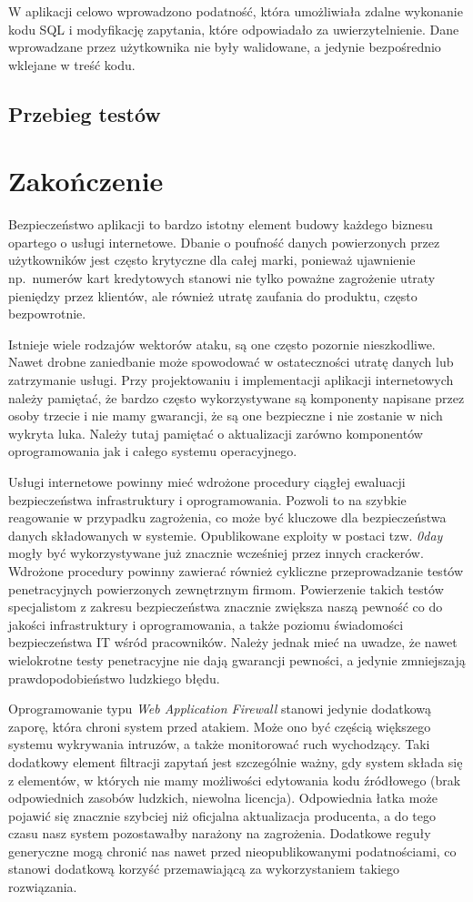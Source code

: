 \documentclass[11pt,a4paper,polish,thesis,oneside]{dcsbook}
\begin{document}
W aplikacji celowo wprowadzono podatność, która umożliwiała zdalne wykonanie kodu SQL i modyfikację zapytania, które odpowiadało za uwierzytelnienie. Dane wprowadzane przez użytkownika nie były walidowane, a jedynie bezpośrednio wklejane w treść kodu.


\section{Przebieg testów}


\chapter{Zakończenie}
Bezpieczeństwo aplikacji to bardzo istotny element budowy każdego biznesu opartego o usługi internetowe. Dbanie o poufność danych powierzonych przez użytkowników jest często krytyczne dla całej marki, ponieważ ujawnienie np.~numerów kart kredytowych stanowi nie tylko poważne zagrożenie utraty pieniędzy przez klientów, ale również utratę zaufania do produktu, często bezpowrotnie.

Istnieje wiele rodzajów wektorów ataku, są one często pozornie nieszkodliwe. Nawet drobne zaniedbanie może spowodować w ostateczności utratę danych lub zatrzymanie usługi. Przy projektowaniu i implementacji aplikacji internetowych należy pamiętać, że bardzo często wykorzystywane są komponenty napisane przez osoby trzecie i nie mamy gwarancji, że są one bezpieczne i nie zostanie w nich wykryta luka. Należy tutaj pamiętać o aktualizacji zarówno komponentów oprogramowania jak i całego systemu operacyjnego.

Usługi internetowe powinny mieć wdrożone procedury ciągłej ewaluacji bezpieczeństwa infrastruktury i oprogramowania. Pozwoli to na szybkie reagowanie w przypadku zagrożenia, co może być kluczowe dla bezpieczeństwa danych składowanych w systemie. Opublikowane exploity w postaci tzw. \textit{0day} mogły być wykorzystywane już znacznie wcześniej przez innych crackerów. Wdrożone procedury powinny zawierać również cykliczne przeprowadzanie testów penetracyjnych powierzonych zewnętrznym firmom. Powierzenie takich testów specjalistom z zakresu bezpieczeństwa znacznie zwiększa naszą pewność co do jakości infrastruktury i oprogramowania, a także poziomu świadomości bezpieczeństwa IT wśród pracowników. Należy jednak mieć na uwadze, że nawet wielokrotne testy penetracyjne nie dają gwarancji pewności, a jedynie zmniejszają prawdopodobieństwo ludzkiego błędu.

Oprogramowanie typu \textit{Web Application Firewall} stanowi jedynie dodatkową zaporę, która chroni system przed atakiem. Może ono być częścią większego systemu wykrywania intruzów, a także monitorować ruch wychodzący. Taki dodatkowy element filtracji zapytań jest szczególnie ważny, gdy system składa się z elementów, w których nie mamy możliwości edytowania kodu źródłowego (brak odpowiednich zasobów ludzkich, niewolna licencja). Odpowiednia łatka może pojawić się znacznie szybciej niż oficjalna aktualizacja producenta, a do tego czasu nasz system pozostawałby narażony na zagrożenia. Dodatkowe reguły generyczne mogą chronić nas nawet przed nieopublikowanymi podatnościami, co stanowi dodatkową korzyść przemawiającą za wykorzystaniem takiego rozwiązania.
\end{document}
